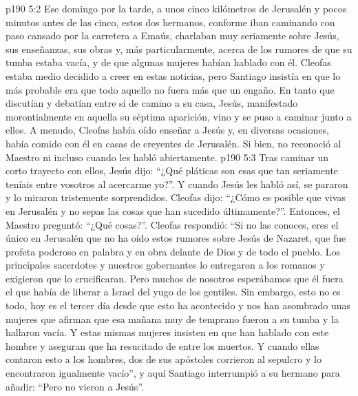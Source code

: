 \vs p190 5:2 Ese domingo por la tarde, a unos cinco kilómetros de Jerusalén y pocos minutos antes de las cinco, estos dos hermanos, conforme iban caminando con paso cansado por la carretera a Emaús, charlaban muy seriamente sobre Jesús, sus enseñanzas, sus obras y, más particularmente, acerca de los rumores de que su tumba estaba vacía, y de que algunas mujeres habían hablado con él. Cleofas estaba medio decidido a creer en estas noticias, pero Santiago insistía en que lo más probable era que todo aquello no fuera más que un engaño. En tanto que discutían y debatían entre sí de camino a su casa, Jesús, manifestado morontialmente en aquella su séptima aparición, vino y se puso a caminar junto a ellos. A menudo, Cleofas había oído enseñar a Jesús y, en diversas ocasiones, había comido con él en casas de creyentes de Jerusalén. Si bien, no reconoció al Maestro ni incluso cuando les habló abiertamente.
\vs p190 5:3 Tras caminar un corto trayecto con ellos, Jesús dijo: “¿Qué pláticas son esas que tan seriamente teníais entre vosotros al acercarme yo?”. Y cuando Jesús les habló así, se pararon y lo miraron tristemente sorprendidos. Cleofas dijo: “¿Cómo es posible que vivas en Jerusalén y no sepas las cosas que han sucedido últimamente?”. Entonces, el Maestro preguntó: “¿Qué cosas?”. Cleofas respondió: “Si no las conoces, eres el único en Jerusalén que no ha oído estos rumores sobre Jesús de Nazaret, que fue profeta poderoso en palabra y en obra delante de Dios y de todo el pueblo. Los principales sacerdotes y nuestros gobernantes lo entregaron a los romanos y exigieron que lo crucificaran. Pero muchos de nosotros esperábamos que él fuera el que había de liberar a Israel del yugo de los gentiles. Sin embargo, esto no es todo, hoy es el tercer día desde que esto ha acontecido y nos han asombrado unas mujeres que afirman que esa mañana muy de temprano fueron a su tumba y la hallaron vacía. Y estas mismas mujeres insisten en que han hablado con este hombre y aseguran que ha resucitado de entre los muertos. Y cuando ellas contaron esto a los hombres, dos de sus apóstoles corrieron al sepulcro y lo encontraron igualmente vacío”, y aquí Santiago interrumpió a su hermano para añadir: “Pero no vieron a Jesús”.
